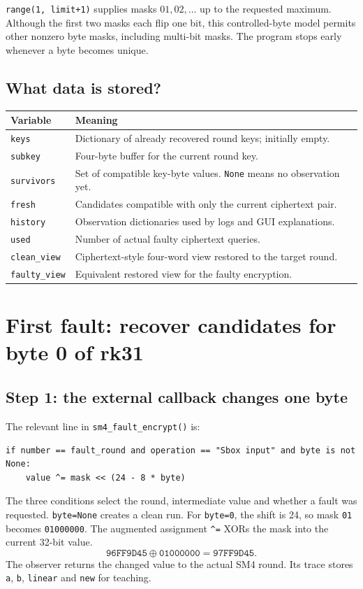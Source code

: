 \documentclass[11pt,a4paper]{report}
\newcommand{\hx}[1]{\texttt{#1}}
\newcommand{\xor}{\mathbin{\oplus}}
\begin{document}
\texttt{range(1, limit+1)} supplies masks \(01,02,\ldots\) up to the requested maximum. Although the first two masks each flip one bit, this controlled-byte model permits other nonzero byte masks, including multi-bit masks. The program stops early whenever a byte becomes unique.

\section{What data is stored?}
\begin{center}\begin{tabular}{p{35mm}p{112mm}}\toprule
Variable&Meaning\\\midrule
\texttt{keys}&Dictionary of already recovered round keys; initially empty.\\
\texttt{subkey}&Four-byte buffer for the current round key.\\
\texttt{survivors}&Set of compatible key-byte values. \texttt{None} means no observation yet.\\
\texttt{fresh}&Candidates compatible with only the current ciphertext pair.\\
\texttt{history}&Observation dictionaries used by logs and GUI explanations.\\
\texttt{used}&Number of actual faulty ciphertext queries.\\
\texttt{clean\_view}&Ciphertext-style four-word view restored to the target round.\\
\texttt{faulty\_view}&Equivalent restored view for the faulty encryption.\\\bottomrule
\end{tabular}\end{center}

\chapter{First fault: recover candidates for byte 0 of rk31}
\section{Step 1: the external callback changes one byte}
The relevant line in \texttt{sm4\_fault\_encrypt()} is:
\begin{Verbatim}
if number == fault_round and operation == "Sbox input" and byte is not None:
    value ^= mask << (24 - 8 * byte)
\end{Verbatim}
The three conditions select the round, intermediate value and whether a fault was requested. \texttt{byte=None} creates a clean run. For \texttt{byte=0}, the shift is 24, so mask \texttt{01} becomes \texttt{01000000}. The augmented assignment \texttt{\^{}=} XORs the mask into the current 32-bit value.
\[\hx{96FF9D45}\xor\hx{01000000}=\hx{97FF9D45}.\]
The observer returns the changed value to the actual SM4 round. Its trace stores \texttt{a}, \texttt{b}, \texttt{linear} and \texttt{new} for teaching.
\end{document}
